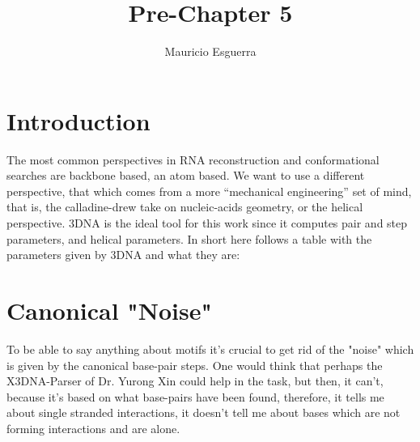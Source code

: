 \documentclass[10pt, oneside, pdftex]{article}
\begin{document}
\title{Pre-Chapter 5}
\author{Mauricio Esguerra}
\maketitle

\section{Introduction}
The most common perspectives in RNA reconstruction and conformational
searches are backbone based, an atom based.  We want to use a
different  perspective,  that which  comes  from  a more  ``mechanical
engineering''   set    of   mind,   that    is,   the   calladine-drew
\cite{elhassan1995}  take  on nucleic-acids  geometry,  or the  helical
perspective. 3DNA  is the ideal tool  for this work  since it computes
pair  and  step parameters,  and  helical  parameters.  In short  here
follows a table with the parameters given by 3DNA and what they are:


\section{Canonical "Noise"}
To be able to say anything about motifs it's crucial to get rid of the
"noise" which is given by the canonical base-pair steps.
One would think that perhaps  the X3DNA-Parser of Dr. Yurong Xin could
help  in the  task, but  then, it  can't, because  it's based  on what
base-pairs  have  been found,  therefore,  it  tells  me about  single
stranded interactions,  it doesn't tell  me about bases which  are not
forming interactions and are alone.
\end{document}
